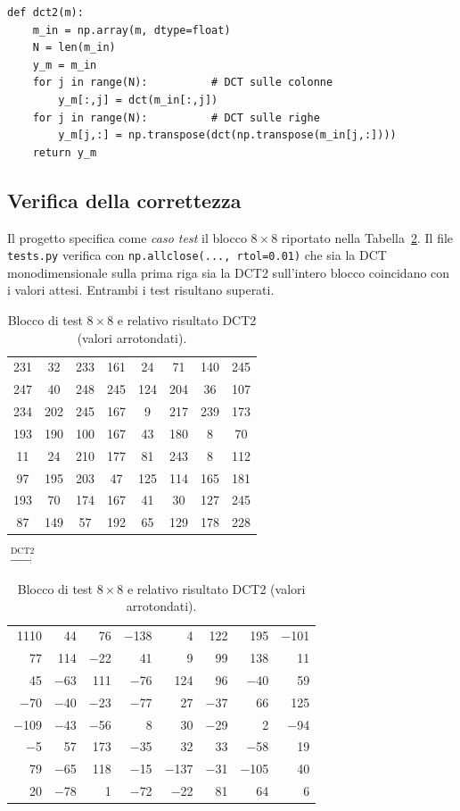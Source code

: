 \documentclass[12pt,a4paper]{article}
\begin{document}
\begin{lstlisting}[caption={DCT2 -- \texttt{utils.py}}]
def dct2(m):
    m_in = np.array(m, dtype=float)
    N = len(m_in)
    y_m = m_in
    for j in range(N):          # DCT sulle colonne
        y_m[:,j] = dct(m_in[:,j])
    for j in range(N):          # DCT sulle righe
        y_m[j,:] = np.transpose(dct(np.transpose(m_in[j,:])))
    return y_m
\end{lstlisting}

\subsection{Verifica della correttezza}

Il progetto specifica come \emph{caso test} il blocco $8\times 8$ riportato
nella Tabella~\ref{tab:testblock}. Il file \texttt{tests.py} verifica con
\texttt{np.allclose(..., rtol=0.01)} che sia la DCT monodimensionale sulla
prima riga sia la DCT2 sull'intero blocco coincidano con i valori attesi.
Entrambi i test risultano superati.

\begin{table}[H]
\centering
\caption{Blocco di test $8\times 8$ e relativo risultato DCT2 (valori arrotondati).}
\label{tab:testblock}
\begin{tabular}{cccccccc}
\toprule
231 & 32  & 233 & 161 & 24  & 71  & 140 & 245 \\
247 & 40  & 248 & 245 & 124 & 204 & 36  & 107 \\
234 & 202 & 245 & 167 & 9   & 217 & 239 & 173 \\
193 & 190 & 100 & 167 & 43  & 180 & 8   & 70  \\
11  & 24  & 210 & 177 & 81  & 243 & 8   & 112 \\
97  & 195 & 203 & 47  & 125 & 114 & 165 & 181 \\
193 & 70  & 174 & 167 & 41  & 30  & 127 & 245 \\
87  & 149 & 57  & 192 & 65  & 129 & 178 & 228 \\
\bottomrule
\end{tabular}
\quad$\xrightarrow{\text{DCT2}}$\quad
\begin{tabular}{rrrrrrrr}
\toprule
1110 & 44   & 76   & $-$138 & 4    & 122  & 195  & $-$101 \\
77   & 114  & $-$22 & 41    & 9    & 99   & 138  & 11     \\
45   & $-$63 & 111  & $-$76  & 124  & 96   & $-$40 & 59    \\
$-$70 & $-$40 & $-$23 & $-$77  & 27   & $-$37 & 66   & 125   \\
$-$109 & $-$43 & $-$56 & 8    & 30   & $-$29 & 2    & $-$94  \\
$-$5  & 57   & 173  & $-$35  & 32   & 33   & $-$58 & 19    \\
79   & $-$65 & 118  & $-$15  & $-$137 & $-$31 & $-$105 & 40  \\
20   & $-$78 & 1    & $-$72  & $-$22 & 81   & 64   & 6     \\
\bottomrule
\end{tabular}
\end{table}
\end{document}
